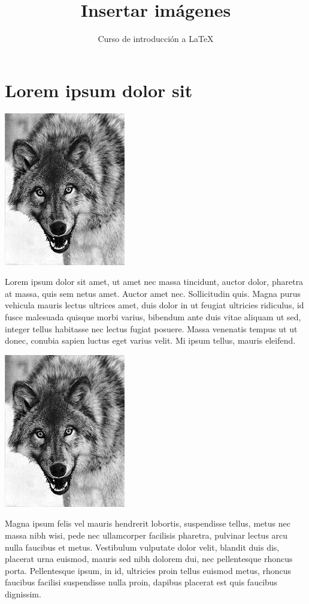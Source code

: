 \documentclass[12pt]{article}
\title{Insertar imágenes}
\author{Curso de introducción a LaTeX}
\begin{document}
\maketitle

\section{Lorem ipsum dolor sit}

\includegraphics{canis} 

Lorem ipsum dolor sit amet, ut amet nec massa tincidunt, auctor dolor, pharetra at massa, quis sem netus amet. Auctor amet nec. Sollicitudin quis. Magna purus vehicula mauris lectus ultrices amet, duis dolor in ut feugiat ultricies ridiculus, id fusce malesuada quisque morbi varius, bibendum ante duis vitae aliquam ut sed, integer tellus habitasse nec lectus fugiat posuere. Massa venenatis tempus ut ut donec, conubia sapien luctus eget varius velit. Mi ipsum tellus, mauris eleifend.

\begin{center}
	\includegraphics{canis}
\end{center}

Magna ipsum felis vel mauris hendrerit lobortis, suspendisse tellus, metus nec massa nibh wisi, pede nec ullamcorper facilisis pharetra, pulvinar lectus arcu nulla faucibus et metus. Vestibulum vulputate dolor velit, blandit duis dis, placerat urna euismod, mauris sed nibh dolorem dui, nec pellentesque rhoncus porta. Pellentesque ipsum, in id, ultricies proin tellus euismod metus, rhoncus faucibus facilisi suspendisse nulla proin, dapibus placerat est quis faucibus dignissim. 
\end{document}
